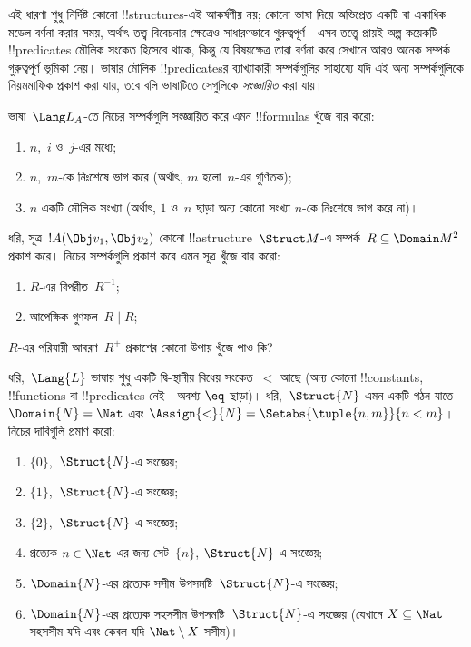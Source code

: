 \documentclass[../../../include/open-logic-section]{subfiles}
\begin{document}
\begin{explain}
এই ধারণা শুধু নির্দিষ্ট কোনো !!{structure}s-এই আকর্ষণীয় নয়; কোনো
ভাষা দিয়ে অভিপ্রেত একটি বা একাধিক মডেল বর্ণনা করার সময়, অর্থাৎ তত্ত্ব
বিবেচনার ক্ষেত্রেও সাধারণভাবে গুরুত্বপূর্ণ। এসব তত্ত্বে প্রায়ই অল্প
কয়েকটি !!{predicate}s মৌলিক সংকেত হিসেবে থাকে, কিন্তু যে বিষয়ক্ষেত্র
তারা বর্ণনা করে সেখানে আরও অনেক সম্পর্ক গুরুত্বপূর্ণ ভূমিকা নেয়।
ভাষার মৌলিক !!{predicate}sর ব্যাখ্যাকারী সম্পর্কগুলির সাহায্যে
যদি এই অন্য সম্পর্কগুলিকে নিয়মমাফিক প্রকাশ করা যায়, তবে বলি ভাষাটিতে
সেগুলিকে \emph{সংজ্ঞায়িত} করা যায়।
\end{explain}

\begin{prob}
ভাষা~$\Lang L_A$-তে নিচের সম্পর্কগুলি সংজ্ঞায়িত করে এমন
!!{formula}s খুঁজে বার করো:
\begin{enumerate}
\item $n$,~$i$ ও~$j$-এর মধ্যে;
\item $n$,~$m$-কে নিঃশেষে ভাগ করে (অর্থাৎ, $m$ হলো~$n$-এর গুণিতক);
\item $n$ একটি মৌলিক সংখ্যা (অর্থাৎ, $1$ ও~$n$ ছাড়া অন্য কোনো সংখ্যা
  $n$-কে নিঃশেষে ভাগ করে না)।
\end{enumerate}
\end{prob}

\begin{prob}
ধরি, সূত্র~$!A(\Obj v_1, \Obj v_2)$ কোনো
!!a{structure}~$\Struct M$-এ সম্পর্ক~$R \subseteq \Domain M^2$ প্রকাশ
করে। নিচের সম্পর্কগুলি প্রকাশ করে এমন সূত্র খুঁজে বার করো:
\begin{enumerate}
\item $R$-এর বিপরীত~$R^{-1}$;
\item আপেক্ষিক গুণফল~$R \mid R$;
\end{enumerate}
$R$-এর পরিযায়ী আবরণ~$R^+$ প্রকাশের কোনো উপায় খুঁজে পাও কি?
\end{prob}

\begin{prob}
ধরি,~$\Lang{L}$ ভাষায় শুধু একটি দ্বি-স্থানীয় বিধেয় সংকেত~$<$ আছে
(অন্য কোনো !!{constant}s, !!{function}s বা !!{predicate}s নেই—অবশ্য
$\eq$ ছাড়া)। ধরি,~$\Struct{N}$ এমন একটি গঠন যাতে
$\Domain{N} = \Nat$ এবং
$\Assign{<}{N} = \Setabs{\tuple{n,m}}{n < m}$। নিচের দাবিগুলি
প্রমাণ করো:
\begin{enumerate}
\item $\{0\}$,~$\Struct{N}$-এ সংজ্ঞেয়;
\item $\{1\}$,~$\Struct{N}$-এ সংজ্ঞেয়;
\item $\{2\}$,~$\Struct{N}$-এ সংজ্ঞেয়;
\item প্রত্যেক $n \in \Nat$-এর জন্য সেট~$\{n\}$,
  $\Struct{N}$-এ সংজ্ঞেয়;
\item $\Domain{N}$-এর প্রত্যেক সসীম উপসমষ্টি~$\Struct{N}$-এ সংজ্ঞেয়;
\item $\Domain{N}$-এর প্রত্যেক সহসসীম উপসমষ্টি~$\Struct{N}$-এ সংজ্ঞেয়
  (যেখানে $X \subseteq \Nat$ সহসসীম যদি এবং কেবল যদি
  $\Nat \setminus X$ সসীম)।
\end{enumerate}
\end{prob}
\end{document}
